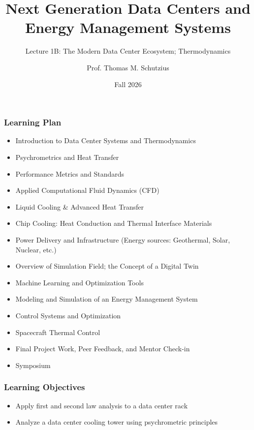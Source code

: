 \documentclass[aspectratio=169,10pt,xcolor={table,dvipsnames},t]{beamer}
\title[lecture 01]{Next Generation Data Centers and Energy Management Systems}
\subtitle{Lecture 1B: The Modern Data Center Ecosystem; Thermodynamics}
\author{Prof. Thomas M. Schutzius}
\institute{Department of Mechanical Engineering}
\date{Fall 2026}
\begin{document}
\begin{frame}
  \titlepage
\end{frame}


{
\smallframetitle
	\begin{frame}
		\frametitle{Learning Plan}
		\begin{itemize}
			\item Introduction to Data Center Systems and Thermodynamics 
			\item Psychrometrics and Heat Transfer 
			\item Performance Metrics and Standards 
			\item Applied Computational Fluid Dynamics (CFD)
			\item Liquid Cooling \& Advanced Heat Transfer 
			\item Chip Cooling: Heat Conduction and Thermal Interface Materials 
			\item Power Delivery and Infrastructure (Energy sources: Geothermal, Solar, Nuclear, etc.)
			\item Overview of Simulation Field; the Concept of a Digital Twin 
			\item Machine Learning and Optimization Tools 
			\item Modeling and Simulation of an Energy Management System 
			\item Control Systems and Optimization 
			\item Spacecraft Thermal Control
			\item Final Project Work, Peer Feedback, and Mentor Check-in 
			\item Symposium 
		\end{itemize}		
	\end{frame}
}

{
\smallframetitle
	\begin{frame}
		\frametitle{Learning Objectives}
		\begin{itemize}
			\item Apply first and second law analysis to a data center rack
			\item Analyze a data center cooling tower using psychrometric principles
		\end{itemize}		
	\end{frame}
}
\end{document}
